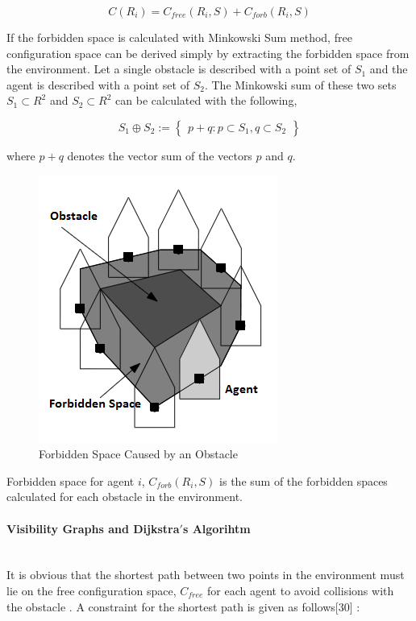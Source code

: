 \begin{equation}
C(R_i) = C_{free}(R_i,S) + C_{forb}(R_i,S)
\end{equation}

If the forbidden space is calculated with Minkowski Sum method, free configuration space can be derived simply by extracting the forbidden space from the environment. Let a single obstacle is described with a point set of $S_1$ and the agent is described with a point set of $S_2$. The Minkowski sum of these two sets $S_1 \subset R^2$ and $S_2 \subset R^2$ can be calculated with the following,
	
\begin{equation}
S_1 \oplus S_2 := \begin{Bmatrix}
p+q : p \subset S_1, q \subset S_2
\end{Bmatrix} 
\end{equation}

where $p+q$ denotes the vector sum of the vectors $p$ and $q$.
		
\begin{figure}[H]
\caption{Forbidden Space Caused by an Obstacle}
\centering
\includegraphics[scale = 0.4]{Forbidden}
\end{figure}
	
Forbidden space for agent $i$, $C_{forb}(R_i, S)$ is the sum of the forbidden spaces calculated for each obstacle in the environment. 
	
\paragraph{Visibility Graphs and Dijkstra$'$s Algorihtm}\hspace{0pt} \\
It is obvious that the shortest path between two points in the environment must lie on the free configuration space, $C_{free}$ for each agent to avoid collisions with the obstacle . A constraint for the shortest path is given as follows[30] : 


